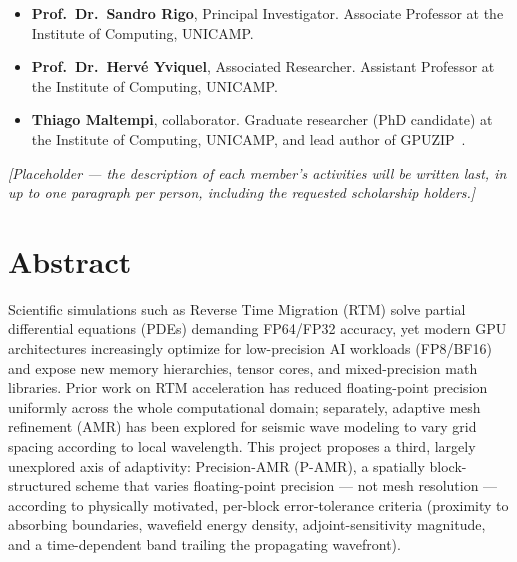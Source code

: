 \documentclass[12pt,a4paper]{article}
\newcommand{\pamr}{P\nobreakdash-AMR}
\begin{document}
\begin{itemize}
  \item \textbf{Prof.\ Dr.\ Sandro Rigo}, Principal Investigator. Associate
        Professor at the Institute of Computing, UNICAMP.
  \item \textbf{Prof.\ Dr.\ Herv\'e Yviquel}, Associated Researcher.
        Assistant Professor at the Institute of Computing, UNICAMP.
  \item \textbf{Thiago Maltempi}, collaborator. Graduate researcher (PhD
        candidate) at the Institute of Computing, UNICAMP, and lead author
        of GPUZIP~\cite{maltempi2025checkpointing}.
\end{itemize}


\emph{[Placeholder --- the description of each member's activities will be
written last, in up to one paragraph per person, including the requested
scholarship holders.]}

\iffalse

\section*{Abstract}

Scientific simulations such as Reverse Time Migration (RTM) solve partial
differential equations (PDEs) demanding FP64/FP32 accuracy, yet modern GPU
architectures increasingly optimize for low-precision AI workloads (FP8/BF16)
and expose new memory hierarchies, tensor cores, and mixed-precision math
libraries. Prior work on RTM acceleration has reduced floating-point precision
uniformly across the whole computational domain; separately, adaptive mesh
refinement (AMR) has been explored for seismic wave modeling to vary grid
spacing according to local wavelength. This project proposes a third, largely
unexplored axis of adaptivity: Precision-AMR (\pamr{}), a spatially
block-structured scheme that varies floating-point precision --- not mesh
resolution --- according to physically motivated, per-block error-tolerance
criteria (proximity to absorbing boundaries, wavefield energy density,
adjoint-sensitivity magnitude, and a time-dependent band trailing the
propagating wavefront).
\end{document}
